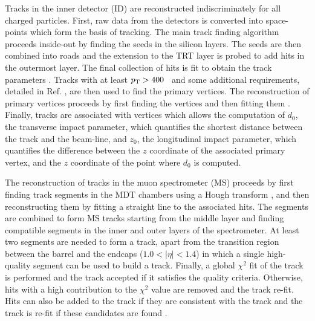 Tracks in the inner detector (ID) are reconstructed indiscriminately for
all charged particles. First, raw data from the detectors is converted
into space-points which form the basis of tracking. The main track finding
algorithm proceeds inside-out by finding the seeds in the silicon layers.
The seeds are then combined into roads and the extension to the TRT layer
is probed to add hits in the outermost layer. The final collection of hits
is fit to obtain the track parameters \cite{ATLAS-CONF-2010-072, Cornelissen:1020106}.
Tracks with at least $p_{\text{T}} > 400$ \MeV~and some additional requirements, detailed
in Ref. \cite{ATL-PHYS-PUB-2015-026}, are then used to find the primary
vertices. The reconstruction of primary vertices proceeds by first finding
the vertices and then fitting them \cite{Aaboud:2016rmg}. Finally, tracks
are associated with vertices which allows the computation of $d_0$, the
transverse impact parameter, which quantifies the shortest distance
between the track and the beam-line, and $z_0$, the longitudinal impact
parameter, which quantifies the difference between the $z$ coordinate
of the associated primary vertex, and the $z$ coordinate of the point
where $d_0$ is computed.

The reconstruction of tracks in the muon spectrometer (MS) proceeds by
first finding track segments in the MDT chambers using a Hough transform
\cite{ILLINGWORTH198887}, and then reconstructing them by fitting a
straight line to the associated hits. The segments are combined to
form MS tracks starting from the middle layer and finding compatible
segments in the inner and outer layers of the spectrometer. At least two
segments are needed to form a track, apart from the transition region
between the barrel and the endcaps ($1.0 < |\eta| < 1.4$)
in which a single high-quality segment can be used to build a track.
Finally, a global $\chi^2$ fit of the track is performed and the track
accepted if it satisfies the quality criteria. Otherwise, hits with 
a high contribution to the $\chi^2$ value are removed and the track re-fit.
Hits can also be added to the track if they are consistent with the
track and the track is re-fit if these candidates are found \cite{Aad:2016jkr}.

